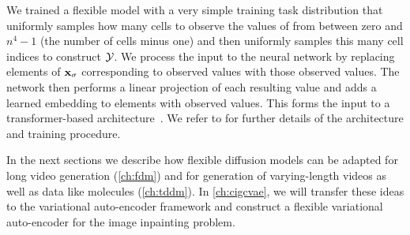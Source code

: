 We trained a flexible model with a very simple training task distribution that uniformly samples how many cells to observe the values of from between zero and $n^4-1$ (the number of cells minus one) and then uniformly samples this many cell indices to construct ${\mathcal{Y}}$. We process the input to the neural network by replacing elements of ${\mathbf{x}}_\sigma$ corresponding to observed values with those observed values. The network then performs a linear projection of each resulting value and adds a learned embedding to elements with observed values. This forms the input to a transformer-based architecture~\citep{vaswani2017attention}. We refer to \citet{weilbach2023graphically} for further details of the architecture and training procedure.

In the next sections we describe how flexible diffusion models can be adapted for long video generation (\cref{ch:fdm}) and for generation of varying-length videos as well as data like molecules (\cref{ch:tddm}). In \cref{ch:cigcvae}, we will transfer these ideas to the variational auto-encoder framework and construct a  flexible variational auto-encoder for the image inpainting problem.
